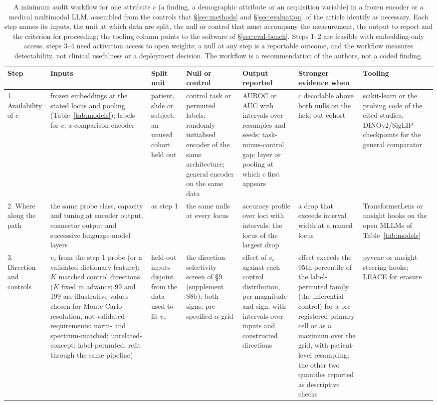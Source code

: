 \begin{table}[!tbp]
\centering\scriptsize\setlength\tabcolsep{3pt}\renewcommand{\arraystretch}{1.0}
\caption{A minimum audit workflow for one attribute $c$ (a finding, a demographic attribute or an acquisition variable) in a frozen encoder or a medical multimodal LLM, assembled from the controls that \S\ref{sec:methods} and \S\ref{sec:evaluation} of the article identify as necessary. Each step names its inputs, the unit at which data are split, the null or control that must accompany the measurement, the output to report and the criterion for proceeding; the tooling column points to the software of \S\ref{sec:eval-bench}. Steps 1--2 are feasible with embedding-only access, steps 3--4 need activation access to open weights; a null at any step is a reportable outcome, and the workflow measures detectability, not clinical usefulness or a deployment decision. The workflow is a recommendation of the authors, not a coded finding.}
\label{tab:workflow}
\begin{tabular}{@{}L{1.6cm}L{2.6cm}L{1.45cm}L{2.95cm}L{2.6cm}L{1.95cm}L{1.8cm}@{}}
\toprule
Step & Inputs & Split unit & Null or control & Output reported & Stronger evidence when & Tooling \\
. Availability of $c$ & frozen embeddings at the stated locus and pooling (Table~\ref{tab:models}); labels for $c$; a comparison encoder & patient, slide or subject; an unused cohort held out & control task or permuted labels; randomly initialised encoder of the same architecture; general encoder on the same data & AUROC or AUC with intervals over resamples and seeds; task-minus-control gap; layer or pooling at which $c$ first appears & $c$ decodable above both nulls on the held-out cohort & scikit-learn or the probing code of the cited studies; DINOv2/SigLIP checkpoints for the general comparator \\
2. Where along the path & the same probe class, capacity and tuning at encoder output, connector output and successive language-model layers & as step 1 & the same nulls at every locus & accuracy profile over loci with intervals; the locus of the largest drop & a drop that exceeds interval width at a named locus & TransformerLens or nnsight hooks on the open MLLMs of Table~\ref{tab:models} \\
3. Direction and controls & $v_c$ from the step-1 probe (or a validated dictionary feature); $K$ matched control directions ($K$ fixed in advance; 99 and 199 are illustrative values chosen for Monte Carlo resolution, not validated requirements: norm- and spectrum-matched; unrelated-concept; label-permuted, refit through the same pipeline) & held-out inputs disjoint from the data used to fit $v_c$ & the direction-selectivity screen of \S9 (supplement S8b); both signs; pre-specified $\alpha$ grid & effect of $v_c$ against each control distribution, per magnitude and sign, with intervals over inputs and constructed directions & effect exceeds the 95th percentile of the label-permuted family (the inferential control) for a pre-registered primary cell or as a maximum over the grid, with patient-level resampling; the other two quantiles reported as descriptive checks & pyvene or nnsight steering hooks; LEACE for erasure \\

\end{tabular}
\end{table}
